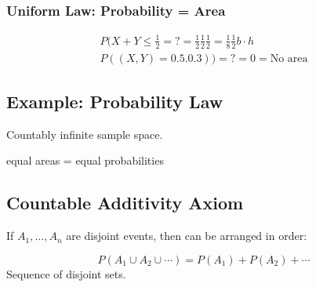 \subsubsection{Uniform Law: Probability = Area}

\begin{align*}
P(X+Y \le \frac{1}{2}=? = \frac{1}{2} \frac{1}{2}\frac{1}{2} = \frac{1}{8}\frac{1}{2}b\cdot h\\
P((X,Y) = 0.5.0.3))= ? = 0 = \text{No area}
\end{align*}





\subsection{Example: Probability Law}

Countably infinite sample space.

equal areas = equal probabilities

\subsection{Countable Additivity Axiom}

If $A_1,\ldots, A_n$ are disjoint events, then can be arranged in order:

$$
P(A_1 \cup A_2 \cup \cdots) = P(A_1) + P(A_2) + \cdots
$$
Sequence of disjoint sets.
